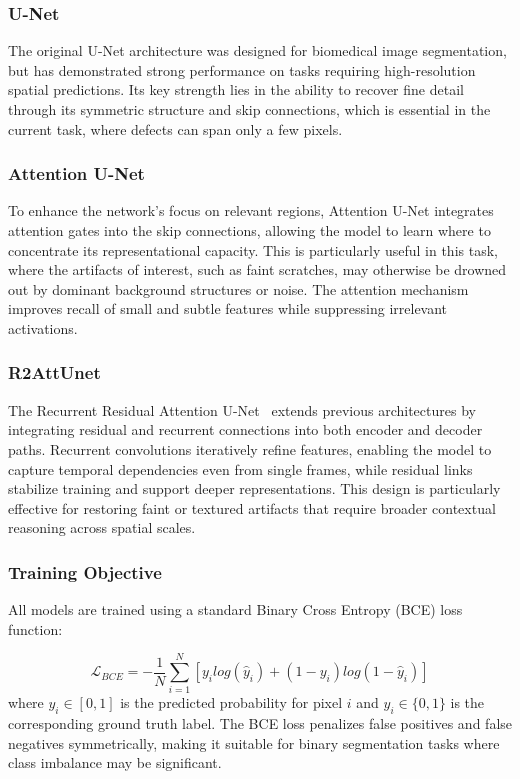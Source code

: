 \documentclass[10pt,a4paper,twocolumn,twoside]{article}
\begin{document}
\subsubsection*{U-Net}
The original U-Net architecture \cite{unet} was designed for biomedical image segmentation, but has demonstrated strong performance on tasks requiring high-resolution spatial predictions. Its key strength lies in the ability to recover fine detail through its symmetric structure and skip connections, which is essential in the current task, where defects can span only a few pixels.
\subsubsection*{Attention U-Net}
To enhance the network's focus on relevant regions, Attention U-Net \cite{attunet} integrates attention gates into the skip connections, allowing the model to learn where to concentrate its representational capacity. This is particularly useful in this task, where the artifacts of interest, such as faint scratches, may otherwise be drowned out by dominant background structures or noise. The attention mechanism improves recall of small and subtle features while suppressing irrelevant activations.
\subsubsection*{R2AttUnet}
The Recurrent Residual Attention U-Net~\cite{r2attunet} extends previous architectures by integrating residual and recurrent connections into both encoder and decoder paths. Recurrent convolutions iteratively refine features, enabling the model to capture temporal dependencies even from single frames, while residual links stabilize training and support deeper representations. This design is particularly effective for restoring faint or textured artifacts that require broader contextual reasoning across spatial scales.
\subsubsection{Training Objective}
All models are trained using a standard Binary Cross Entropy (BCE) \cite{bceloss }loss function:

\begin{equation*}
    \mathcal{L}_{BCE} = -\frac{1}{N} \sum^N_{i=1}[y_ilog(\hat{y}_i)+(1-y_i)log(1-\hat{y}_i)]
\end{equation*}
where $\hat{y_i} \in [0,1]$ is the predicted probability for pixel $i$ and $y_i\in\{0,1\}$ is the corresponding ground truth label. The BCE loss penalizes false positives and false negatives symmetrically, making it suitable for binary segmentation tasks where class imbalance may be significant.
\end{document}

